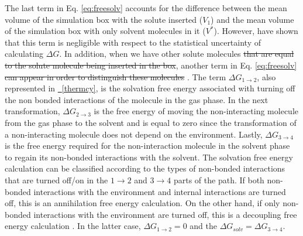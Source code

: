 \documentclass[
	12pt,				%
	openany,			%
	oneside,			%
	a4paper,			%
	english,			%
	brazil				%
	]{abntex2}
\providecommand{\DIFadd}[1]{{\protect\color{blue}\uwave{#1}}}
\providecommand{\DIFdel}[1]{{\protect\color{red}\sout{#1}}}
\providecommand{\DIFaddbegin}{}
\providecommand{\DIFaddend}{}
\providecommand{\DIFdelbegin}{}
\providecommand{\DIFdelend}{}
\newcommand{\figref}[2][{}]{\hyperref[#2]{\figurename~\ref{#2}#1}}
\providecommand{\DIFadd}[1]{{\protect\color{blue}\uwave{#1}}} %
\providecommand{\DIFdel}[1]{{\protect\color{red}\sout{#1}}}                      %
\providecommand{\DIFaddbegin}{} %
\providecommand{\DIFaddend}{} %
\providecommand{\DIFdelbegin}{} %
\providecommand{\DIFdelend}{} %
\begin{document}
\DIFdelend The last term in Eq. \ref{eq:freesolv} accounts for the difference between the mean volume of the simulation box with the solute inserted ($V_{1}$) and the mean volume of the simulation box with only solvent molecules in it ($V^{*}$). However,  have shown that this term is negligible with respect to the statistical uncertainty of calculating $\Delta G$. In addition, when we have other solute molecules \DIFdelbegin \DIFdel{that are equal to the solute molecule being inserted in the box}\DIFdelend \DIFaddbegin \DIFadd{in solution}\DIFaddend , another term in Eq. \ref{eq:freesolv} \DIFdelbegin \DIFdel{can appear in order to distinguish these molecules }\DIFdelend \DIFaddbegin \DIFadd{may be necessary }\DIFaddend \cite{shirts2013}. The term $\Delta G_{1 \rightarrow 2}$, also represented in \figref{thermcy},  is the solvation free energy associated with turning off the non bonded interactions of the molecule in the gas phase. In the next transformation, $\Delta G_{2 \rightarrow 3}$ is the free energy of moving the non-interacting molecule from the gas phase to the solvent and is equal to zero since the transformation of a non-interacting molecule does not depend on the environment. Lastly, $\Delta G_{3 \rightarrow 4}$ is the free energy required for the non-interaction molecule in the solvent phase to regain its non-bonded interactions with the solvent.  The solvation free energy calculation can be classified according to the types of non-bonded interactions that are turned off/on in the $1 \rightarrow 2$ and $ 3 \rightarrow 4$ parts of the path. If both non-bonded interactions with the environment and internal interactions are turned off, this is an annihilation free energy calculation. On the other hand, if only non-bonded interactions with the environment are turned off, this is a decoupling free energy calculation \cite{klimovich}. In the latter case, $\Delta G_{1 \rightarrow 2} = 0$ and the $\Delta G_{solv} = \Delta G_{3 \rightarrow 4} $.  
\end{document}
